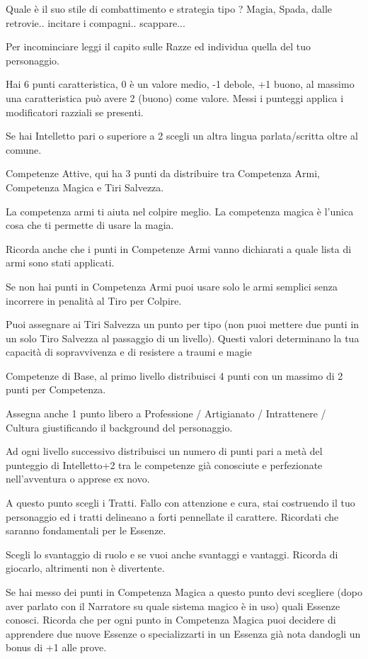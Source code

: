 \documentclass[a4paper,11pt,twoside,openany]{book}
\begin{document}
Quale è il suo stile di combattimento e strategia tipo ? Magia, Spada, dalle retrovie.. incitare i compagni.. scappare...

Per incominciare leggi il capito sulle Razze ed individua quella del tuo personaggio.

Hai 6 punti caratteristica, 0 è un valore medio, -1 debole, +1 buono, al massimo una caratteristica può avere 2 (buono) come valore. Messi i punteggi applica i modificatori razziali se presenti.

Se hai Intelletto pari o superiore a 2 scegli un altra lingua parlata/scritta oltre al comune.

Competenze Attive, qui ha 3 punti da distribuire tra Competenza Armi, Competenza Magica e Tiri Salvezza.

La competenza armi ti aiuta nel colpire meglio. La competenza magica è l'unica cosa che ti permette di usare la magia.

Ricorda anche che i punti in Competenze Armi vanno dichiarati a quale lista di armi sono stati applicati.

Se non hai punti in Competenza Armi puoi usare solo le armi semplici senza incorrere in penalità al Tiro per Colpire.

Puoi assegnare ai Tiri Salvezza un punto per tipo (non puoi mettere due punti in un solo Tiro Salvezza al passaggio di un livello). Questi valori determinano la tua capacità di sopravvivenza e di resistere a traumi e magie

Competenze di Base, al primo livello distribuisci 4 punti con un massimo di 2 punti per Competenza.

Assegna anche 1 punto libero a Professione / Artigianato / Intrattenere / Cultura giustificando il background del personaggio.

Ad ogni livello successivo distribuisci un numero di punti pari a metà del punteggio di Intelletto+2 tra le competenze già conosciute e perfezionate nell'avventura o apprese ex novo.

A questo punto scegli i Tratti. Fallo con attenzione e cura, stai costruendo il tuo personaggio ed i tratti delineano a forti pennellate il carattere. Ricordati che saranno fondamentali per le Essenze.

Scegli lo svantaggio di ruolo e se vuoi anche svantaggi e vantaggi. Ricorda di giocarlo, altrimenti non è divertente.

Se hai messo dei punti in Competenza Magica a questo punto devi scegliere (dopo aver parlato con il Narratore su quale sistema magico è in uso) quali Essenze conosci. Ricorda che per ogni punto in Competenza Magica puoi decidere di apprendere due nuove Essenze o specializzarti in un Essenza già nota dandogli un bonus di +1 alle prove.
\end{document}
